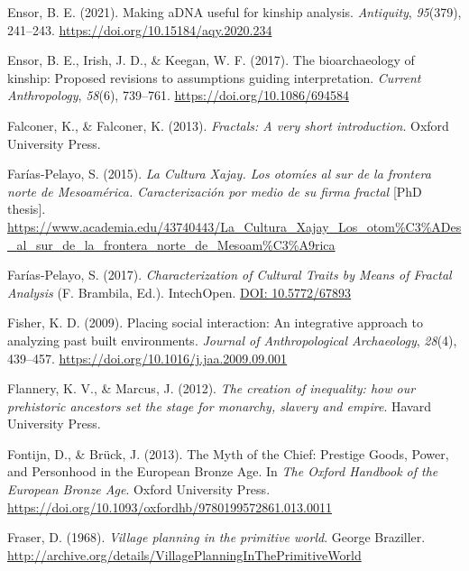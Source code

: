 \documentclass[
  12pt,
]{book}
\newlength{\cslhangindent}
\newlength{\cslentryspacingunit} %
\newenvironment{CSLReferences}[2] %
 {%
  \setlength{\parindent}{0pt}
  \ifodd #1
  \let\oldpar\par
  \def\par{\hangindent=\cslhangindent\oldpar}
  \fi
  \setlength{\parskip}{#2\cslentryspacingunit}
 }%
 {}
\begin{document}
\begin{CSLReferences}{1}{0}
\leavevmode{}%
Ensor, B. E. (2021). Making aDNA useful for kinship analysis. \emph{Antiquity}, \emph{95}(379), 241--243. \url{https://doi.org/10.15184/aqy.2020.234}

\leavevmode{}%
Ensor, B. E., Irish, J. D., \& Keegan, W. F. (2017). The bioarchaeology of kinship: Proposed revisions to assumptions guiding interpretation. \emph{Current Anthropology}, \emph{58}(6), 739--761. \url{https://doi.org/10.1086/694584}

\leavevmode{}%
Falconer, K., \& Falconer, K. (2013). \emph{Fractals: A very short introduction}. Oxford University Press.

\leavevmode{}%
Farías-Pelayo, S. (2015). \emph{La Cultura Xajay. Los otomíes al sur de la frontera norte de Mesoamérica. Caracterización por medio de su firma fractal} {[}PhD thesis{]}. \url{https://www.academia.edu/43740443/La_Cultura_Xajay_Los_otom\%C3\%ADes_al_sur_de_la_frontera_norte_de_Mesoam\%C3\%A9rica}

\leavevmode{}%
Farías-Pelayo, S. (2017). \emph{Characterization of Cultural Traits by Means of Fractal Analysis} (F. Brambila, Ed.). IntechOpen. \href{https://DOI:\%2010.5772/67893}{DOI: 10.5772/67893}

\leavevmode{}%
Fisher, K. D. (2009). Placing social interaction: An integrative approach to analyzing past built environments. \emph{Journal of Anthropological Archaeology}, \emph{28}(4), 439--457. \url{https://doi.org/10.1016/j.jaa.2009.09.001}

\leavevmode{}%
Flannery, K. V., \& Marcus, J. (2012). \emph{The creation of inequality: how our prehistoric ancestors set the stage for monarchy, slavery and empire}. Havard University Press.

\leavevmode{}%
Fontijn, D., \& Brück, J. (2013). The {Myth} of the {Chief}: {Prestige Goods}, {Power}, and {Personhood} in the {European Bronze Age}. In \emph{The {Oxford Handbook} of the {European Bronze Age}}. {Oxford University Press}. \url{https://doi.org/10.1093/oxfordhb/9780199572861.013.0011}

\leavevmode{}%
Fraser, D. (1968). \emph{Village planning in the primitive world}. George Braziller. \url{http://archive.org/details/VillagePlanningInThePrimitiveWorld}


\end{CSLReferences}
\end{document}
